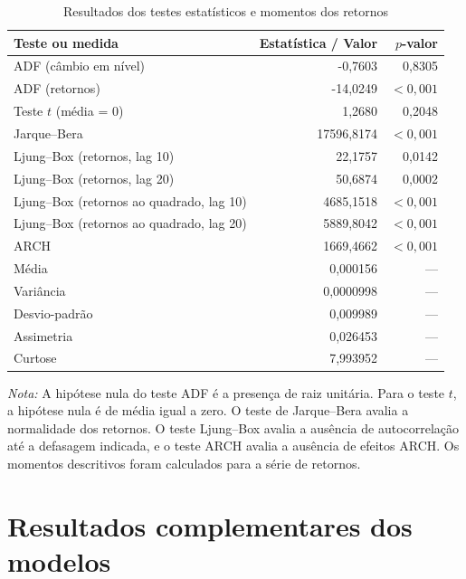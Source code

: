 \begin{table}[H]
    \centering
    \caption{Resultados dos testes estatísticos e momentos dos retornos}
    \label{tab:testes_completos}
    \small
    \begin{tabular}{lrr}
        \toprule
        Teste ou medida & Estatística / Valor & $p$-valor \\
        \midrule
        ADF (câmbio em nível) & -0,7603 & 0,8305 \\
        ADF (retornos) & -14,0249 & $<0,001$ \\
        Teste $t$ (média = 0) & 1,2680 & 0,2048 \\
        Jarque--Bera & 17596,8174 & $<0,001$ \\
        Ljung--Box (retornos, lag 10) & 22,1757 & 0,0142 \\
        Ljung--Box (retornos, lag 20) & 50,6874 & 0,0002 \\
        Ljung--Box (retornos ao quadrado, lag 10) & 4685,1518 & $<0,001$ \\
        Ljung--Box (retornos ao quadrado, lag 20) & 5889,8042 & $<0,001$ \\
        ARCH & 1669,4662 & $<0,001$ \\
        \midrule
        Média & 0,000156 & --- \\
        Variância & 0,0000998 & --- \\
        Desvio-padrão & 0,009989 & --- \\
        Assimetria & 0,026453 & --- \\
        Curtose & 7,993952 & --- \\
        \bottomrule
    \end{tabular}

    \vspace{0.2cm}
    \begin{minipage}{0.9\textwidth}
        \footnotesize
        \textit{Nota:} A hipótese nula do teste ADF é a presença de raiz unitária. Para o teste $t$, a hipótese nula é de média igual a zero. O teste de Jarque--Bera avalia a normalidade dos retornos. O teste Ljung--Box avalia a ausência de autocorrelação até a defasagem indicada, e o teste ARCH avalia a ausência de efeitos ARCH. Os momentos descritivos foram calculados para a série de retornos.
    \end{minipage}
\end{table}


\chapter{Resultados complementares dos modelos}

